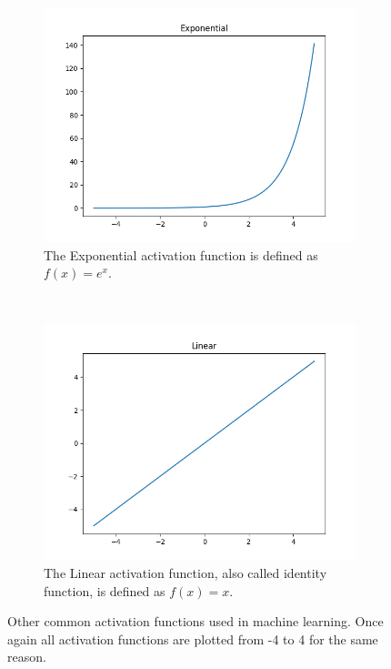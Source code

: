 \begin{figure}[h!]
\begin{subfigure}[t]{0.5\textwidth}
		\centering
		\includegraphics[width=\textwidth]{img/methodology_neuralNetwork_activationFunction_exponential.png}
		\caption{The Exponential activation function is defined as $f(x) = e^x$.}
	\end{subfigure}%
	~ 
	\begin{subfigure}[t]{0.5\textwidth}
		\centering
		\includegraphics[width=\textwidth]{img/methodology_neuralNetwork_activationFunction_linear.png}
		\caption{The Linear activation function, also called identity function, is defined as $f(x) = x$.}
	\end{subfigure}
	\caption{Other common activation functions used in machine learning. Once again all activation functions are plotted from -4 to 4 for the same reason.}
	\label{pic:methodology_neuralNetwork_activationFunction2}
\end{figure}

